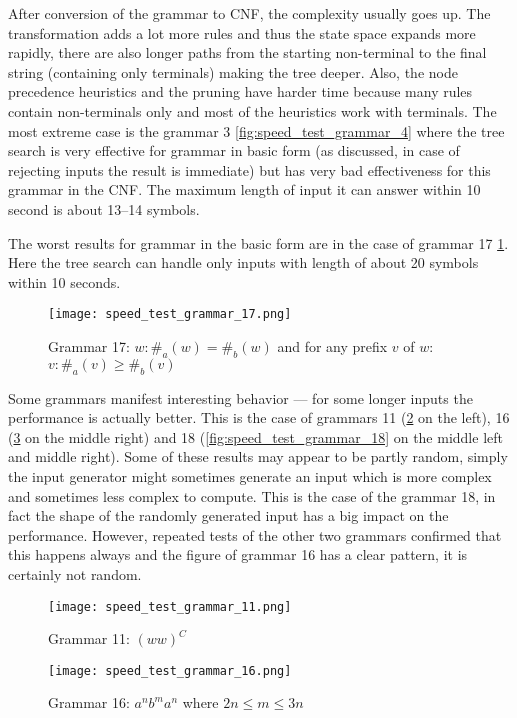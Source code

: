 After conversion of the grammar to CNF, the complexity usually goes up. The transformation adds a lot more rules and thus the state space expands more rapidly, there are also longer paths from the starting non-terminal to the final string (containing only terminals) making the tree deeper. Also, the node precedence heuristics and the pruning have harder time because many rules contain non-terminals only and most of the heuristics work with terminals. The most extreme case is the grammar 3 \ref{fig:speed_test_grammar_4} where the tree search is very effective for grammar in basic form (as discussed, in case of rejecting inputs the result is immediate) but has very bad effectiveness for this grammar in the CNF. The maximum length of input it can answer within 10 second is about 13--14 symbols.

The worst results for grammar in the basic form are in the case of grammar 17 \ref{fig:speed_test_grammar_17}. Here the tree search can handle only inputs with length of about 20 symbols within 10 seconds.

\begin{figure}[h!]
  \texttt{[image: speed\_test\_grammar\_17.png]}
  \caption{Grammar 17: $w: \#_a(w) = \#_b(w)$ and for any prefix $v$ of $w$: $v: \#_a(v) \geq \#_b(v)$}
  \label{fig:speed_test_grammar_17}
\end{figure}

Some grammars manifest interesting behavior --- for some longer inputs the performance is actually better. This is the case of grammars 11 (\ref{fig:speed_test_grammar_11} on the left), 16 (\ref{fig:speed_test_grammar_16} on the middle right) and 18 (\ref{fig:speed_test_grammar_18} on the middle left and middle right). Some of these results may appear to be partly random, simply the input generator might sometimes generate an input which is more complex and sometimes less complex to compute. This is the case of the grammar 18, in fact the shape of the randomly generated input has a big impact on the performance. However, repeated tests of the other two grammars confirmed that this happens always and the figure of grammar 16 has a clear pattern, it is certainly not random.

\begin{figure}[h!]
  \texttt{[image: speed\_test\_grammar\_11.png]}
  \caption{Grammar 11: $(ww)^C$}
  \label{fig:speed_test_grammar_11}
\end{figure}

\begin{figure}[h!]
  \texttt{[image: speed\_test\_grammar\_16.png]}
  \caption{Grammar 16: $a^n b^m a^n$ where $2n \leq m \leq 3n$}
  \label{fig:speed_test_grammar_16}
\end{figure}

